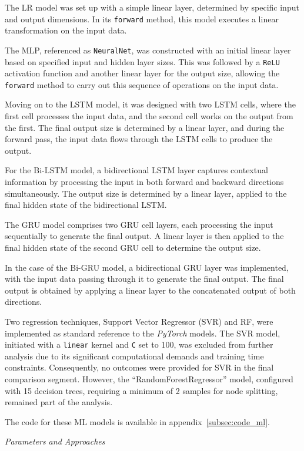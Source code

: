 The LR model was set up with a simple linear layer, determined by specific input and output dimensions.
In its \texttt{forward} method, this model executes a linear transformation on the input data.

The MLP, referenced as \texttt{NeuralNet}, was constructed with an initial linear layer based on specified input and hidden layer sizes.
This was followed by a \texttt{ReLU} activation function and another linear layer for the output size, allowing the \texttt{forward} method to carry out this sequence of operations on the input data.

Moving on to the LSTM model, it was designed with two LSTM cells, where the first cell processes the input data, and the second cell works on the output from the first.
The final output size is determined by a linear layer, and during the forward pass, the input data flows through the LSTM cells to produce the output.

For the Bi-LSTM model, a bidirectional LSTM layer captures contextual information by processing the input in both forward and backward directions simultaneously.
The output size is determined by a linear layer, applied to the final hidden state of the bidirectional LSTM\@.

The GRU model comprises two GRU cell layers, each processing the input sequentially to generate the final output.
A linear layer is then applied to the final hidden state of the second GRU cell to determine the output size.

In the case of the Bi-GRU model, a bidirectional GRU layer was implemented, with the input data passing through it to generate the final output.
The final output is obtained by applying a linear layer to the concatenated output of both directions.

Two regression techniques, Support Vector Regressor (SVR) and RF, were implemented as standard reference to the \textit{PyTorch} models.
The SVR model, initiated with a \texttt{linear} kernel and \texttt{C} set to 100, was excluded from further analysis due to its significant computational demands and training time constraints.
Consequently, no outcomes were provided for SVR in the final comparison segment.
However, the \enquote{RandomForestRegressor} model, configured with 15 decision trees, requiring a minimum of 2 samples for node splitting, remained part of the analysis.

The code for these ML models is available in appendix~\ref{subsec:code_ml}.

\newpage
\textit{Parameters and Approaches}
\vspace{-0.05cm}

